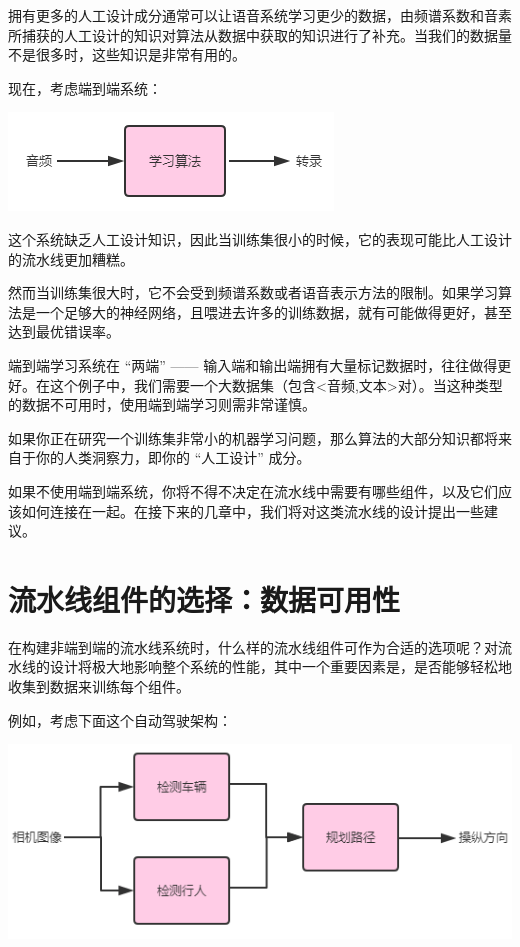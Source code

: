 拥有更多的人工设计成分通常可以让语音系统学习更少的数据，由频谱系数和音素所捕获的人工设计的知识对算法从数据中获取的知识进行了补充。当我们的数据量不是很多时，这些知识是非常有用的。

现在，考虑端到端系统：

\includegraphics{./img/ch48_02.png}

这个系统缺乏人工设计知识，因此当训练集很小的时候，它的表现可能比人工设计的流水线更加糟糕。

然而当训练集很大时，它不会受到频谱系数或者语音表示方法的限制。如果学习算法是一个足够大的神经网络，且喂进去许多的训练数据，就有可能做得更好，甚至达到最优错误率。

端到端学习系统在 ``两端'' ------
输入端和输出端拥有大量标记数据时，往往做得更好。在这个例子中，我们需要一个大数据集（包含\textless 音频,文本\textgreater 对）。当这种类型的数据不可用时，使用端到端学习则需非常谨慎。

如果你正在研究一个训练集非常小的机器学习问题，那么算法的大部分知识都将来自于你的人类洞察力，即你的
``人工设计'' 成分。

如果不使用端到端系统，你将不得不决定在流水线中需要有哪些组件，以及它们应该如何连接在一起。在接下来的几章中，我们将对这类流水线的设计提出一些建议。

\hypertarget{ux6d41ux6c34ux7ebfux7ec4ux4ef6ux7684ux9009ux62e9ux6570ux636eux53efux7528ux6027}{%
\chapter{流水线组件的选择：数据可用性}\label{ux6d41ux6c34ux7ebfux7ec4ux4ef6ux7684ux9009ux62e9ux6570ux636eux53efux7528ux6027}}

在构建非端到端的流水线系统时，什么样的流水线组件可作为合适的选项呢？对流水线的设计将极大地影响整个系统的性能，其中一个重要因素是，是否能够轻松地收集到数据来训练每个组件。

例如，考虑下面这个自动驾驶架构：

\includegraphics{./img/ch48_03.png}

